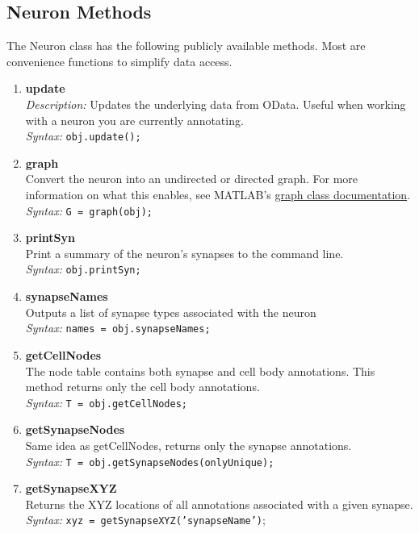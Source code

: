 \documentclass[12pt]{exam}
\begin{document}
	\subsection{Neuron Methods}
	The Neuron class has the following publicly available methods. Most are convenience functions to simplify data access.
	\begin{enumerate}
		\item \textbf{update}\\
		\textit{Description:} Updates the underlying data from OData. Useful when working with a neuron you are currently annotating.\\
		\textit{Syntax:} \texttt{obj.update();}
		\item \textbf{graph}\\
		Convert the neuron into an undirected or directed graph. For more information on what this enables, see MATLAB's \href{https://www.mathworks.com/help/matlab/graph-and-network-algorithms.html}{graph class documentation}.\\
		\textit{Syntax:} \texttt{G = graph(obj);}
		\item \textbf{printSyn}\\
		Print a summary of the neuron's synapses to the command line.\\
		\textit{Syntax:} \texttt{obj.printSyn;}
		\item \textbf{synapseNames}\\
		Outputs a list of synapse types associated with the neuron\\
		\textit{Syntax:} \texttt{names = obj.synapseNames;}
		\item \textbf{getCellNodes}\\
		The node table contains both synapse and cell body annotations. This method returns only the cell body annotations.\\
		\textit{Syntax:} \texttt{T = obj.getCellNodes;}
		\item \textbf{getSynapseNodes}\\
		Same idea as getCellNodes, returns only the synapse annotations.\\
		\textit{Syntax:} \texttt{T = obj.getSynapseNodes(onlyUnique);}
		\item \textbf{getSynapseXYZ}\\
		Returns the XYZ locations of all annotations associated with a given synapse.\\
		\textit{Syntax:} \texttt{xyz = getSynapseXYZ('synapseName')};

\end{enumerate}
\end{document}
